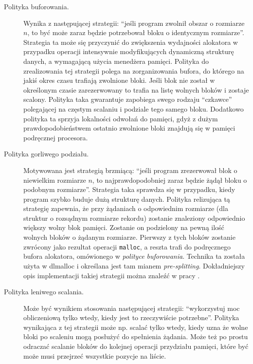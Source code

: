 \documentclass[12pt,a4paper,titlepage,twoside]{mwart}
\begin{document}
\begin{description}
\item[Polityka buforowania.] Wynika z następującej strategii: ``jeśli program
zwolnił obszar o rozmiarze $n$, to być może zaraz będzie potrzebował bloku o
identycznym rozmiarze''. Strategia ta może się przyczynić do zwiększenia
wydajności alokatora w przypadku operacji intensywnie modyfikujących
dynamiczną strukturę danych, a wymagającą użycia menedżera pamięci. Polityka do
zrealizowania tej strategii polega na zorganizowania bufora, do którego na
jakiś okres czasu trafiają zwolnione bloki. Jeśli blok nie został w określonym
czasie zarezerwowany to trafia na listę wolnych bloków i zostaje scalony.
Polityka taka gwarantuje zapobiega swego rodzaju ``czkawce'' polegającej na
częstym scalaniu i podziale tego samego bloku. Dodatkowo polityka ta sprzyja
lokalności odwołań do pamięci, gdyż z dużym prawdopodobieństwem ostatnio
zwolnione bloki znajdują się w pamięci podręcznej procesora.
\vspace{1ex}

\item[Polityka gorliwego podziału.] Motywowana jest strategią brzmiącą: ``jeśli
program zrezerwował blok o niewielkim rozmiarze $n$, to najprawdopodobniej
zaraz będzie żądął bloku o podobnym rozmiarze''. Strategia taka sprawdza się w
przypadku, kiedy program szybko buduje dużą strukturę danych. Polityka
relizująca tą strategię zapewnia, że przy żądaniach o odpowiednim rozmiarze
(dla struktur o rozsądnym rozmiarze rekordu) zostanie znaleziony odpowiednio
większy wolny blok pamięci. Zostanie on podzielony na pewną ilość wolnych
bloków o żądanym rozmiarze. Pierwszy z tych bloków zostanie zwrócony jako
rezultat operacji \texttt{malloc}, a reszta trafi do podręcznego bufora
alokatora, omówionego w \textit{polityce buforowania}. Technika ta została
użyta w dlmalloc \cite{douglea96malloc} i określana jest tam mianem
\textit{pre-splitting}. Dokładniejszy opis implementacji takiej strategii można
znaleźć w pracy \cite{weinstock88quickfit}.
\vspace{1ex}

\item[Polityka leniwego scalania.] Może być wynikiem stosowania następującej
strategii: ``wykorzystuj moc obliczeniową tylko wtedy, kiedy jest to
rzeczywiście potrzebne''. Polityka wynikająca z tej strategii może np. scalać
tylko wtedy, kiedy uzna że wolne bloki po scaleniu mogą posłużyć do spełnienia
żądania. Może też po prostu odraczać scalanie bloków do kolejnej operacji
przydziału pamięci, które być może musi przejrzeć wszystkie pozycje na liście.
\end{description}
\end{document}
